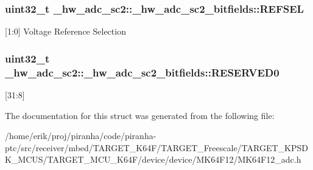 \subsubsection[{\texorpdfstring{R\+E\+F\+S\+EL}{REFSEL}}]{\setlength{\rightskip}{0pt plus 5cm}uint32\+\_\+t \+\_\+hw\+\_\+adc\+\_\+sc2\+::\+\_\+hw\+\_\+adc\+\_\+sc2\+\_\+bitfields\+::\+R\+E\+F\+S\+EL}\hypertarget{struct__hw__adc__sc2_1_1__hw__adc__sc2__bitfields_a3d9281aa34cc80265a57a153d02446fb}{}\label{struct__hw__adc__sc2_1_1__hw__adc__sc2__bitfields_a3d9281aa34cc80265a57a153d02446fb}
\mbox{[}1\+:0\mbox{]} Voltage Reference Selection 
\subsubsection[{\texorpdfstring{R\+E\+S\+E\+R\+V\+E\+D0}{RESERVED0}}]{\setlength{\rightskip}{0pt plus 5cm}uint32\+\_\+t \+\_\+hw\+\_\+adc\+\_\+sc2\+::\+\_\+hw\+\_\+adc\+\_\+sc2\+\_\+bitfields\+::\+R\+E\+S\+E\+R\+V\+E\+D0}\hypertarget{struct__hw__adc__sc2_1_1__hw__adc__sc2__bitfields_a6101b8604a8ee115ad068f1eb15af8ce}{}\label{struct__hw__adc__sc2_1_1__hw__adc__sc2__bitfields_a6101b8604a8ee115ad068f1eb15af8ce}
\mbox{[}31\+:8\mbox{]} 

The documentation for this struct was generated from the following file\+:\begin{DoxyCompactItemize}
\item 
/home/erik/proj/piranha/code/piranha-\/ptc/src/receiver/mbed/\+T\+A\+R\+G\+E\+T\+\_\+\+K64\+F/\+T\+A\+R\+G\+E\+T\+\_\+\+Freescale/\+T\+A\+R\+G\+E\+T\+\_\+\+K\+P\+S\+D\+K\+\_\+\+M\+C\+U\+S/\+T\+A\+R\+G\+E\+T\+\_\+\+M\+C\+U\+\_\+\+K64\+F/device/device/\+M\+K64\+F12/M\+K64\+F12\+\_\+adc.\+h\end{DoxyCompactItemize}
